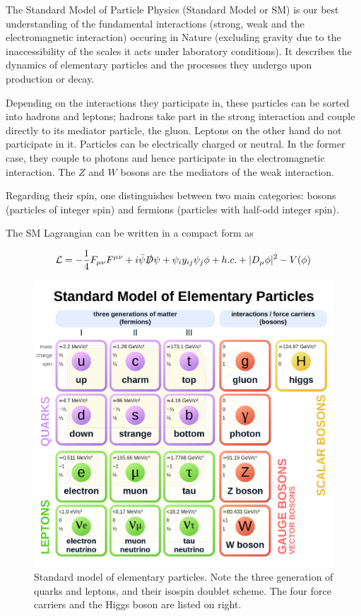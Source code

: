 

The Standard Model of Particle Physics (Standard Model or SM) is our best understanding of the fundamental interactions (strong, weak and the electromagnetic interaction) occuring in Nature (excluding gravity due to the inaccessibility of the scales it acts under laboratory conditions). It describes the dynamics of elementary particles and the processes they undergo upon production or decay.

Depending on the interactions they participate in, these particles can be sorted into hadrons and leptons; hadrons take part in the strong interaction and couple directly to its mediator particle, the gluon. Leptons on the other hand do not participate in it. Particles can be electrically charged or neutral. In the former case, they couple to photons and hence participate in the electromagnetic interaction. The $Z$ and $W$ bosons are the mediators of the weak interaction.

Regarding their spin, one distinguishes between two main categories: bosons (particles of integer spin) and fermions (particles with half-odd integer spin).

The SM Lagrangian can be written in a compact form as

\begin{equation}
	\mathcal{L} = -\frac{1}{4}F_{\mu\nu}F^{\mu\nu} + i \bar{\psi}\slashed{D}\psi + \psi_iy_{ij}\psi_j\phi + h.c. + |D_\mu\phi|^2 - V(\phi)
	\label{eq:lagrangian}
\end{equation}

\begin{figure}[h!]
	\centering
	\includegraphics[width=0.6\linewidth]{figures/theory/sm.png}
	\caption{Standard model of elementary particles. Note the three generation of quarks and leptons, and their isospin doublet scheme. The four force carriers and the Higgs boson are listed on right. \cite{enwiki:1101993746}}
	\label{fig:sm}
\end{figure}

